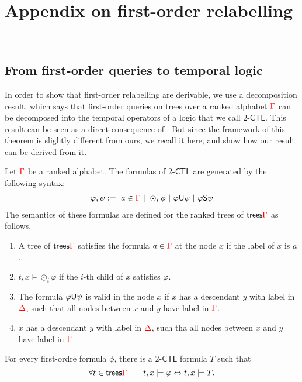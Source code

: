 

\section{Appendix on first-order relabelling}~\label{sec:AppendixForat}

\subsection{From first-order queries to temporal logic}

In order to show that first-order relabelling are derivable, we use a decomposition result, which says that first-order queries on trees over a ranked alphabet ${\color{red}{\Gamma}}$ can be decomposed into the temporal operators of a logic that we call $2$-$\mathsf{CTL}$. 
This result can be seen as a direct consequence of \cite{}. But since the framework of this theorem is slightly different from ours, we recall it here, and show how our result can be derived from it.

Let ${\color{red}{\Gamma}}$ be a ranked alphabet. The formulas of 2-$\mathsf{CTL}$ are generated by the following syntax:
\begin{align*}
\varphi, \psi:= \ a\in {\color{red}{\Gamma}} \ | \ \odot_i \phi \ | \ \varphi\mathsf U \psi \ | \ \varphi\mathsf S\psi  
\end{align*}
The semantics of these formulas are defined for the ranked trees of $\mathsf {trees} {\color{red}{\Gamma}}$ as follows.
\begin{enumerate}
\item A tree of $\mathsf {trees} {\color{red}{\Gamma}}$ satisfies the formula $a\in{\color{red}{\Gamma}}$ at the node $x$ if the label of $x$ is $a$.
\item $t, x\models \odot_i \varphi$ if the $i$-th child of $x$ satisfies $\varphi$.
\item  The formula $\varphi\mathsf U \psi$  is valid  in the node $x$ if $x$ has a descendant $y$ with label in ${\color{red}{\Delta}}$, such that all nodes between $x$ and $y$ have label in ${\color{red}{\Gamma}}$. 
\item $x$ has a descendant $y$ with label in ${\color{red}{\Delta}}$, such tha all nodes between $x$ and $y$ have label in ${\color{red}{\Gamma}}$.
\end{enumerate}

\begin{lemma}%
For every first-ordre formula $\phi$, there is a $2$-$\mathsf{CTL}$ formula $T$ such that
$$ \forall t\in \mathsf {trees} {\color{red}{\Gamma}} \qquad t,x\models \varphi \Leftrightarrow t,x\models T.$$
\end{lemma}

